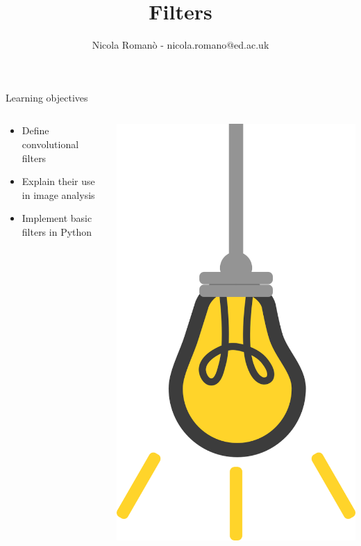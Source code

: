 \documentclass[9pt, aspectratio=169]{beamer}
\author{Nicola Roman\`o - nicola.romano@ed.ac.uk}
\title{Filters}
\date{}
\begin{document}

\begin{frame}
    \titlepage
\end{frame}

\begin{frame}
    {Learning objectives}
    \begin{columns}
        \begin{column}{0.8\textwidth}
            \begin{itemize}
                \item Define convolutional filters
                \item Explain their use in image analysis
                \item Implement basic filters in Python
            \end{itemize}
        \end{column}
        \begin{column}{0.2\textwidth}
            \includegraphics[angle=-30, origin=tr, width=1.5\textwidth]{lightbulb.png}

\end{column}
\end{columns}
\end{frame}
\end{document}
